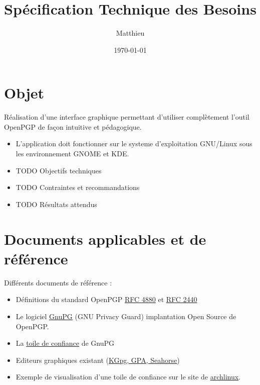 \documentclass{"../res/univ-projet"}
\title{Spécification Technique des Besoins}
\author{Matthieu \bsc{Fin}}
\date{\today}
\begin{document}
\maketitle
\newpage
\tableofcontents
\newpage

\section{Objet}

Réalisation d'une interface graphique permettant d'utiliser complètement l'outil OpenPGP
de façon intuitive et pédagogique.

\begin{itemize}
\item L'application doit fonctionner sur le systeme d'exploitation GNU/Linux
  sous les environnement GNOME et KDE.
\item TODO Objectifs techniques%
\item TODO Contraintes et recommandations %
\item TODO Résultats attendus %
\end{itemize}


\section{Documents applicables et de référence}
Différents documents de référence :
\begin{itemize}
\item Définitions du standard OpenPGP \href{file:../../ressources/openPGP/rfc4880-en.pdf}{RFC 4880}
  et \href{file:../../ressources/openPGP/rfc2440-fr.pdf}{RFC 2440}
\item Le logiciel \href{https://www.gnupg.org/}{GnuPG} (GNU Privacy Guard) implantation Open Source
  de OpenPGP.
\item La \href{https://www.gnupg.org/gph/fr/manual.html#AEN541}{toile de confiance} de GnuPG
\item Editeurs graphiques existant 
  (\href{http://www.gnupg.org/related_software/frontends.en.html}{KGpg, GPA, Seahorse})
\item Exemple de visualisation d'une toile de confiance sur le site de 
  \href{https://www.archlinux.org/master-keys/#visualization}{archlinux}.
\end{itemize}
\end{document}
